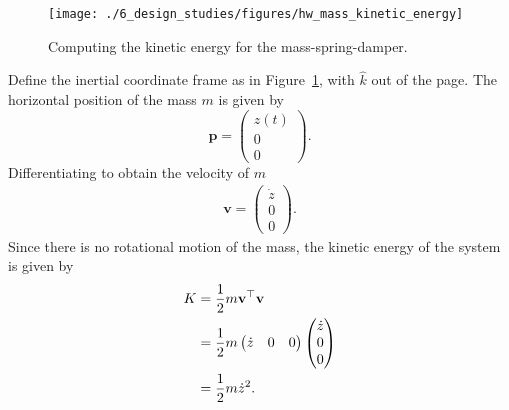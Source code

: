 
\begin{figure}[H]
   \centering
   \texttt{[image: ./6\_design\_studies/figures/hw\_mass\_kinetic\_energy]} 
   \caption{Computing the kinetic energy for the mass-spring-damper.}
   \label{fig:hw_mass_kinetic_energy}
\end{figure}
Define the inertial coordinate frame as in Figure~\ref{fig:hw_mass_kinetic_energy}, with $\hat{k}$ out of the page.  The horizontal position of the mass $m$ is given by 
\[
\mathbf{p} = \begin{pmatrix} z(t) \\ 0 \\ 0 \end{pmatrix}.
\]
Differentiating to obtain the velocity of $m$ 
\begin{align*}
\mathbf{v} = \begin{pmatrix}  \dot{z} \\ 0 \\ 0 \end{pmatrix}.
\end{align*}
Since there is no rotational motion of the mass, the 
kinetic energy of the system is given by
\begin{align}
K &= \frac{1}{2}m\mathbf{v}^\top\mathbf{v} \notag\\
  &= \frac{1}{2}m\begin{pmatrix} \dot{z} & 0 & 0 \end{pmatrix} \begin{pmatrix} \dot{z} \\ 0 \\ 0 \end{pmatrix} \notag\\
  &= \frac{1}{2}m\dot{z}^2.
  \label{eq:mass_kinetic_energy}
\end{align}





